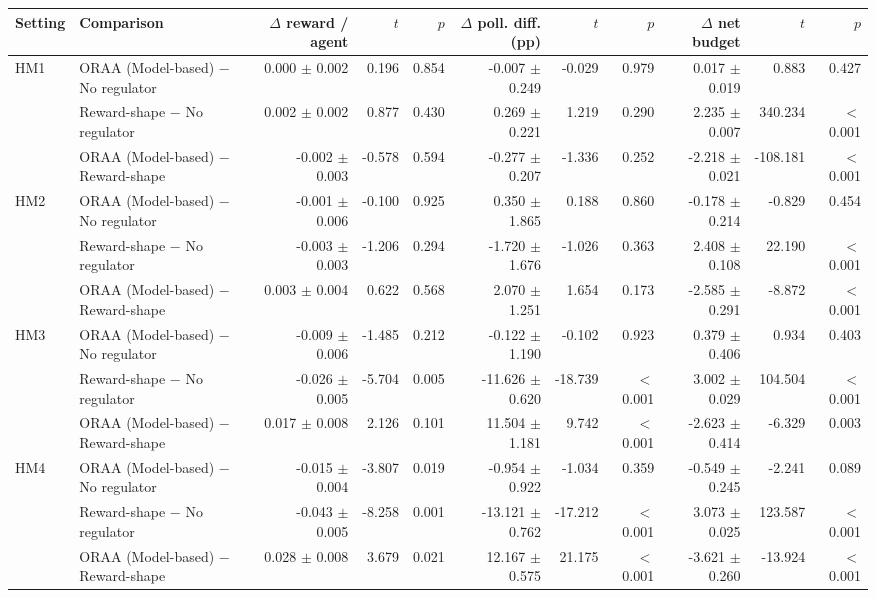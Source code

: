 \begin{tabular}{llrrrrrrrrr}
\toprule
Setting & Comparison & $\Delta$ reward / agent & $t$ & $p$ & $\Delta$ poll. diff. (pp) & $t$ & $p$ & $\Delta$ net budget & $t$ & $p$ \\
\midrule
HM1 & ORAA (Model-based) $-$ No regulator & 0.000 $\pm$ 0.002 & 0.196 & 0.854 & -0.007 $\pm$ 0.249 & -0.029 & 0.979 & 0.017 $\pm$ 0.019 & 0.883 & 0.427 \\
 & Reward-shape $-$ No regulator & 0.002 $\pm$ 0.002 & 0.877 & 0.430 & 0.269 $\pm$ 0.221 & 1.219 & 0.290 & 2.235 $\pm$ 0.007 & 340.234 & $<$0.001 \\
 & ORAA (Model-based) $-$ Reward-shape & -0.002 $\pm$ 0.003 & -0.578 & 0.594 & -0.277 $\pm$ 0.207 & -1.336 & 0.252 & -2.218 $\pm$ 0.021 & -108.181 & $<$0.001 \\
\addlinespace
HM2 & ORAA (Model-based) $-$ No regulator & -0.001 $\pm$ 0.006 & -0.100 & 0.925 & 0.350 $\pm$ 1.865 & 0.188 & 0.860 & -0.178 $\pm$ 0.214 & -0.829 & 0.454 \\
 & Reward-shape $-$ No regulator & -0.003 $\pm$ 0.003 & -1.206 & 0.294 & -1.720 $\pm$ 1.676 & -1.026 & 0.363 & 2.408 $\pm$ 0.108 & 22.190 & $<$0.001 \\
 & ORAA (Model-based) $-$ Reward-shape & 0.003 $\pm$ 0.004 & 0.622 & 0.568 & 2.070 $\pm$ 1.251 & 1.654 & 0.173 & -2.585 $\pm$ 0.291 & -8.872 & $<$0.001 \\
\addlinespace
HM3 & ORAA (Model-based) $-$ No regulator & -0.009 $\pm$ 0.006 & -1.485 & 0.212 & -0.122 $\pm$ 1.190 & -0.102 & 0.923 & 0.379 $\pm$ 0.406 & 0.934 & 0.403 \\
 & Reward-shape $-$ No regulator & -0.026 $\pm$ 0.005 & -5.704 & 0.005 & -11.626 $\pm$ 0.620 & -18.739 & $<$0.001 & 3.002 $\pm$ 0.029 & 104.504 & $<$0.001 \\
 & ORAA (Model-based) $-$ Reward-shape & 0.017 $\pm$ 0.008 & 2.126 & 0.101 & 11.504 $\pm$ 1.181 & 9.742 & $<$0.001 & -2.623 $\pm$ 0.414 & -6.329 & 0.003 \\
\addlinespace
HM4 & ORAA (Model-based) $-$ No regulator & -0.015 $\pm$ 0.004 & -3.807 & 0.019 & -0.954 $\pm$ 0.922 & -1.034 & 0.359 & -0.549 $\pm$ 0.245 & -2.241 & 0.089 \\
 & Reward-shape $-$ No regulator & -0.043 $\pm$ 0.005 & -8.258 & 0.001 & -13.121 $\pm$ 0.762 & -17.212 & $<$0.001 & 3.073 $\pm$ 0.025 & 123.587 & $<$0.001 \\
 & ORAA (Model-based) $-$ Reward-shape & 0.028 $\pm$ 0.008 & 3.679 & 0.021 & 12.167 $\pm$ 0.575 & 21.175 & $<$0.001 & -3.621 $\pm$ 0.260 & -13.924 & $<$0.001 \\

\end{tabular}
